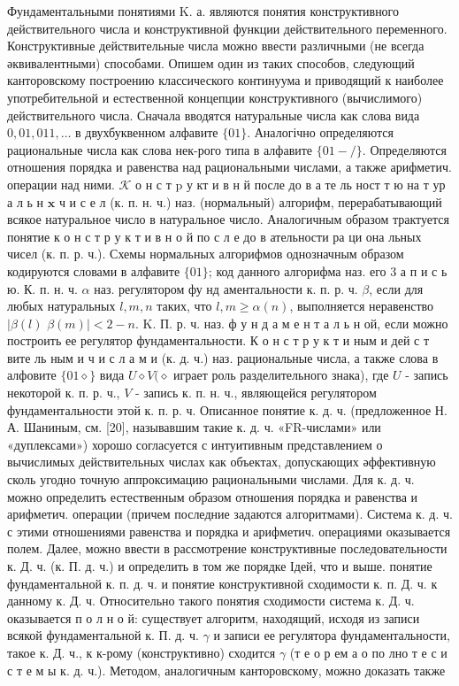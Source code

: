 \documentclass[10pt]{article}
\begin{document}
Фундаментальными понятиями $\mathrm{K}$. а. являются понятия конструктивного действительного числа и конструктивной функции действительного переменного. Конструктивные действительные числа можно ввести различными (не всегда әквивалентными) способами. Опишем один из таких способов, следующий канторовскому построению классического континуума и приводящий к наиболее употребительной и естественной концепции конструктивного (вычислимого) действительного числа. Сначала вводятся натуральные числа как слова вида $0,01,011, \ldots$ в двухбуквенном алфавите $\{01\}$. Аналогічно определяются рациональные числа как слова нек-рого типа в алфавите $\{01-/\}$. Определяются отношения порядка и равенства над рациональными числами, а также арифметич. операции над ними. $\mathcal{K}$ о н с т $\mathrm{p}$ у кт и в н й после до в а те ль ност т ю на т ур а л ь н $\mathbf{x}$ ч и с е л (к. п. н. ч.) наз. (нормальный) алгорифм, перерабатывающий всякое натуральное число в натуральное число. Аналогичным образом трактуется понятие к о н с т р у к т и в н о й по с л е до в ательности ра ци она льных чисел (к. п. р. ч.). Схемы нормальных алгорифмов однозначным образом кодируются словами в алфавите $\{01\}$; код данного алгорифма наз. его 3 а п и с ь ю. К. п. н. ч. $\alpha$ наз. регулятором фу нд аментальности к. п. р. ч. $\beta$, если для любых натуральных $l, m, n$ таких, что $l, m \geqslant \alpha(n)$, выполняется неравенство $\mid \beta(l)$ $\beta(m) \mid<2-n$. K. П. р. ч. наз. ф у н д а м е н т а л ь н ой, если можно построить ее регулятор фундаментальности. К о н с т р у к т и ным и дей с т вите ль ным и ч и с л а м и (к. д. ч.) наз. рациональные числа, а также слова в алфовите $\{01 \diamond\}$ вида $U \diamond V(\diamond$ играет роль разделительного знака), где $U$ - запись некоторой к. п. р. ч., $V$ - запись к. п. н. ч., являющейся регулятором фундаментальности этой к. п. р. ч. Описанное понятие к. д. ч. (предложенное Н. А. Шаниным, см. [20], называвшим такие к. д. ч. «FR-числами» или «дуплексами») хорошо согласуется с интуитивным представлением о вычислимых действительных числах как объектах, допускающих әффективную сколь угодно точную аппроксимацию рациональными числами. Для к. д. ч. можно определить естественным образом отношения порядка и равенства и арифметич. операции (причем последние задаются алгоритмами). Система к. д. ч. с этими отношениями равенства и порядка и арифметич. операциями оказывается полем. Далее, можно ввести в рассмотрение конструктивные последовательности к. Д. ч. (к. П. д. ч.) и определить в том же порядке Ідей, что и выше. понятие фундаментальной к. п. д. ч. и понятие конструктивной сходимости к. п. Д. ч. к данному к. Д. ч. Относительно такого понятия сходимости система к. Д. ч. оказывается п о л н о й: существует алгоритм, находящий, исходя из записи всякой фундаментальной к. П. д. ч. $\gamma$ и записи ее регулятора фундаментальности, такое к. Д. ч., к к-рому (конструктивно) сходится $\gamma$ (т е о р ем а о по лно т е с и с т е м ы к. д. ч.). Методом, аналогичным канторовскому, можно доказать также
\end{document}
